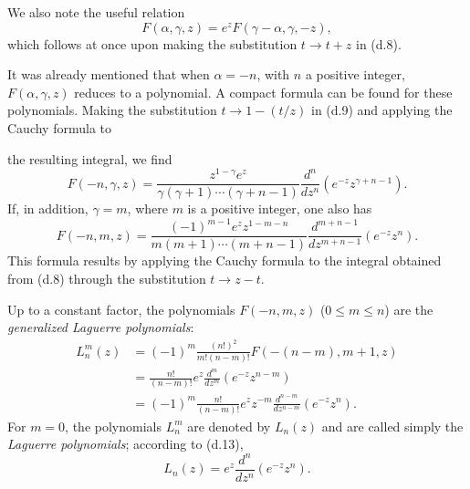 We also note the useful relation
\begin{equation}
 F(\alpha,\gamma,z)=e^zF(\gamma-\alpha,\gamma,-z),
 \tag{d.10}
\end{equation}
which follows at once upon making the substitution $t\to t+z$ in (d.8).

It was already mentioned that when $\alpha=-n$, with $n$ a positive integer,
$F(\alpha,\gamma,z)$ reduces to a polynomial. A compact formula can be found
for these polynomials. Making the substitution $t\to1-(t/z)$ in (d.9) and
applying the Cauchy formula to

the resulting integral, we find
\begin{equation}
 F(-n,\gamma,z)=\frac{z^{1-\gamma}e^z}
 {\gamma(\gamma+1)\cdots(\gamma+n-1)}
 \frac{d^n}{dz^n}\left(e^{-z}z^{\gamma+n-1}\right).
 \tag{d.11}
\end{equation}
If, in addition, $\gamma=m$, where $m$ is a positive integer, one also has
\begin{equation}
 F(-n,m,z)=\frac{(-1)^{m-1}e^zz^{1-m-n}}
 {m(m+1)\cdots(m+n-1)}
 \frac{d^{m+n-1}}{dz^{m+n-1}}\left(e^{-z}z^n\right).
 \tag{d.12}
\end{equation}
This formula results by applying the Cauchy formula to the integral obtained
from (d.8) through the substitution $t\to z-t$.

Up to a constant factor, the polynomials $F(-n,m,z)$ ($0\le m\le n$) are the
\emph{generalized Laguerre polynomials}:
\begin{equation}
 \begin{split}
 L_n^m(z)&=(-1)^m\frac{(n!)^2}{m!(n-m)!}
 F(-(n-m),m+1,z)\\
 &=\frac{n!}{(n-m)!}e^z\frac{d^m}{dz^m}
 \left(e^{-z}z^{n-m}\right)\\
 &=(-1)^m\frac{n!}{(n-m)!}e^zz^{-m}
 \frac{d^{n-m}}{dz^{n-m}}\left(e^{-z}z^n\right).
 \end{split}
 \tag{d.13}
\end{equation}
For $m=0$, the polynomials $L_n^m$ are denoted by $L_n(z)$ and are called
simply the \emph{Laguerre polynomials}; according to (d.13),
\[
 L_n(z)=e^z\frac{d^n}{dz^n}\left(e^{-z}z^n\right).
\]

